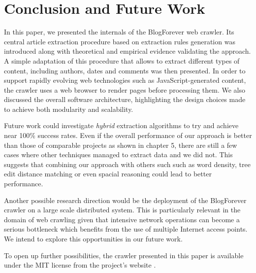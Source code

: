 \section{Conclusion and Future Work}
In this paper, we presented the internals of the BlogForever web crawler. Its central article extraction procedure based on extraction rules generation was introduced along with theoretical and empirical evidence validating the approach. A simple adaptation of this procedure that allows to extract different types of content, including authors, dates and comments was then presented. In order to support rapidly evolving web technologies such as JavaScript-generated content, the crawler uses a web browser to render pages before processing them. We also discussed the overall software architecture, highlighting the design choices made to achieve both modularity and scalability.

Future work could investigate \emph{hybrid} extraction algorithms to try and achieve near 100\% success rates. Even if the overall performance of our approach is better than those of comparable projects as shown in chapter 5, there are still a few cases where other techniques managed to extract data and we did not. This suggests that combining our approach with others such such as word density, tree edit distance matching or even spacial reasoning could lead to better performance.

Another possible research direction would be the deployment of the BlogForever crawler on a large scale distributed system. This is particularly relevant in the domain of web crawling given that intensive network operations can become a serious bottleneck which benefits from the use of multiple Internet access points. We intend to explore this opportunities in our future work.


To open up further possibilities, the crawler presented in this paper is available under the MIT license from the project's website \cite{blogforevercrawler}. 
